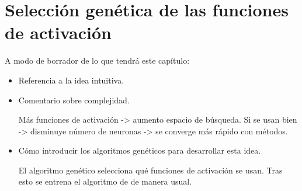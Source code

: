 \newpage
\chapter{Selección genética de las funciones de activación }
\label{ch08:genetic-selection}

A modo de borrador de lo que tendrá este capítulo: 
\begin{itemize}
    \item Referencia a la idea intuitiva.
    \item Comentario sobre complejidad.
    
    Más funciones de activación -> aumento espacio de búsqueda.
    Si se usan bien -> disminuye número de neuronas 
    -> se converge más rápido con métodos. 
    \item Cómo introducir los algoritmos genéticos para desarrollar esta idea. 
    
    El algoritmo genético selecciona qué funciones de activación se usan. Tras esto se entrena el algoritmo de de manera usual.
\end{itemize}